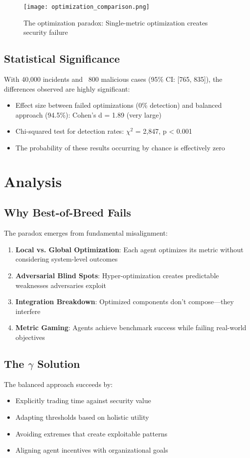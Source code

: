 \documentclass[11pt]{article}
\begin{document}
\begin{figure}[h]
\centering
\texttt{[image: optimization\_comparison.png]}
\caption{The optimization paradox: Single-metric optimization creates security failure\label{fig:paradox}}
\end{figure}

\subsection{Statistical Significance}
With 40,000 incidents and ~800 malicious cases (95\% CI: [765, 835]), the differences observed are highly significant:
\begin{itemize}
\item Effect size between failed optimizations (0\% detection) and balanced approach (94.5\%): Cohen's d = 1.89 (very large)
\item Chi-squared test for detection rates: $\chi^2$ = 2,847, p < 0.001
\item The probability of these results occurring by chance is effectively zero
\end{itemize}

\section{Analysis}

\subsection{Why Best-of-Breed Fails}
The paradox emerges from fundamental misalignment:

\begin{enumerate}
\item \textbf{Local vs. Global Optimization}: Each agent optimizes its metric without considering system-level outcomes
\item \textbf{Adversarial Blind Spots}: Hyper-optimization creates predictable weaknesses adversaries exploit
\item \textbf{Integration Breakdown}: Optimized components don't compose—they interfere
\item \textbf{Metric Gaming}: Agents achieve benchmark success while failing real-world objectives
\end{enumerate}

\subsection{The $\gamma$ Solution}
The balanced approach succeeds by:
\begin{itemize}
\item Explicitly trading time against security value
\item Adapting thresholds based on holistic utility
\item Avoiding extremes that create exploitable patterns
\item Aligning agent incentives with organizational goals
\end{itemize}
\end{document}
